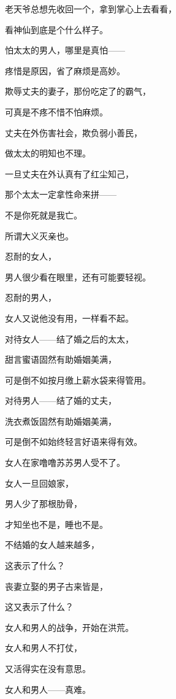 \par 老天爷总想先收回一个，拿到掌心上去看看，
\par 看神仙到底是个什么样子。
\par 
\par 怕太太的男人，哪里是真怕——
\par 疼惜是原因，省了麻烦是高妙。
\par 欺辱丈夫的妻子，那份吃定了的霸气，
\par 可真是不疼不惜不怕麻烦。
\par 
\par 丈夫在外伤害社会，欺负弱小善民，
\par 做太太的明知也不理。
\par 一旦丈夫在外认真有了红尘知己，
\par 那个太太一定拿性命来拼——
\par 不是你死就是我亡。
\par 所谓大义灭亲也。
\par 
\par 忍耐的女人，
\par 男人很少看在眼里，还有可能要轻视。
\par 忍耐的男人，
\par 女人又说他没有用，一样看不起。
\par 
\par 对待女人——结了婚之后的太太，
\par 甜言蜜语固然有助婚姻美满，
\par 可是倒不如按月缴上薪水袋来得管用。
\par 对待男人——结了婚的丈夫，
\par 洗衣煮饭固然有助婚姻美满，
\par 可是倒不如始终轻言好语来得有效。
\par 
\par 女人在家噜噜苏苏男人受不了。
\par 女人一旦回娘家，
\par 男人少了那根肋骨，
\par 才知坐也不是，睡也不是。
\par 
\par 不结婚的女人越来越多，
\par 这表示了什么？
\par 
\par 丧妻立娶的男子古来皆是，
\par 这又表示了什么？
\par 
\par 女人和男人的战争，开始在洪荒。
\par 女人和男人不打仗，
\par 又活得实在没有意思。
\par 女人和男人——真难。



